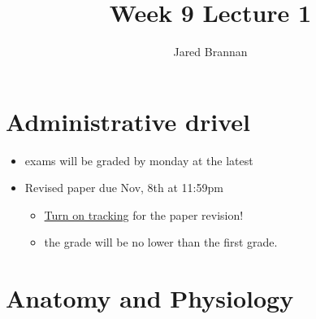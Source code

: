 \documentclass{article}
\title{Week 9 Lecture 1}
\author{Jared Brannan }
\theoremstyle{definition}
\begin{document}
\maketitle

\section{Administrative drivel}
\begin{itemize}
	\item exams will be graded by monday at the latest
	\item Revised paper due Nov, 8th at 11:59pm
		\begin{itemize}
			\item \underline{Turn on tracking} for the paper revision!
			\item the grade will be no lower than the first grade.
		\end{itemize}
\end{itemize}

\section{Anatomy and Physiology}
\end{document}
